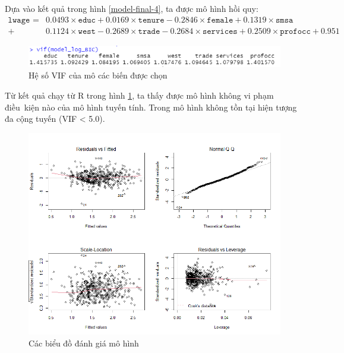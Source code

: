 Dựa vào kết quả trong hình \ref{model-final-4}, ta được mô hình hồi quy:
\begin{equation*}
\begin{split}
	\texttt{lwage } = &0.0493\times \texttt{educ} + 0.0169 \times \texttt{tenure} -0.2846 \times \texttt{female}  + 0.1319 \times \texttt{smsa}\\+ &0.1124 \times\texttt{west}-0.2689\times \texttt{trade} -0.2684 \times \texttt{services}  + 0.2509\times \texttt{profocc} + 0.951
\end{split}
\end{equation*}

\begin{figure}[H]
	\centering
	\includegraphics[width=\textwidth]{../Photo Of Result/vif-4}	
	\caption{Hệ số VIF của mô các biến được chọn}
	\label{vif}
\end{figure}

Từ kết quả chạy từ R trong hình \ref{vif}, ta thấy được mô hình không vi phạm điều~kiện nào của mô hình tuyến tính. Trong mô hình không tồn tại hiện tượng đa cộng tuyến (VIF < 5.0).

\begin{figure}[H]
	\includegraphics[width=\textwidth]{../Photo Of Result/diagnostic-plot-4}
	\caption{Các biểu đồ đánh giá mô hình}
	\label{diagnostic}
\end{figure}

